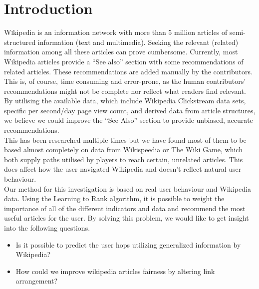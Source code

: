 \section{Introduction}

\lettrine[nindent=0em,lines=3]{W}ikipedia is an information network with more than 5 million articles of semi-structured information (text and multimedia). Seeking the relevant (related) information among all these articles can prove cumbersome.
Currently, most Wikipedia articles provide a ``See also'' section with some recommendations of related articles. These recommendations are added manually by the contributors. This is, of course, time consuming and error-prone, as the human contributors' recommendations might not be complete nor reflect what readers find relevant. \\
By utilising the available data, which include Wikipedia Clickstream data sets, specific per second/day page view count, and derived data from article structures, we believe we could improve the ``See Also'' section to provide unbiased, accurate recommendations. \\
This has been researched multiple times but we have found most of them to be based almost completely on data from Wikispeedia or The Wiki Game, which both supply paths utilised by players to reach certain, unrelated articles. This does affect how the user navigated Wikipedia and doesn't reflect natural user behaviour. \\
Our method for this investigation is based on real user behaviour and Wikipedia data. Using the Learning to Rank algorithm, it is possible to weight the importance of all of the different indicators and data and recommend the most useful articles for the user. By solving this problem, we would like to get insight into the following questions.
\begin{itemize}
\item Is it possible to predict the user hops utilizing generalized information by Wikipedia?
\item How could we improve wikipedia articles fairness by altering link arrangement?
\end{itemize}